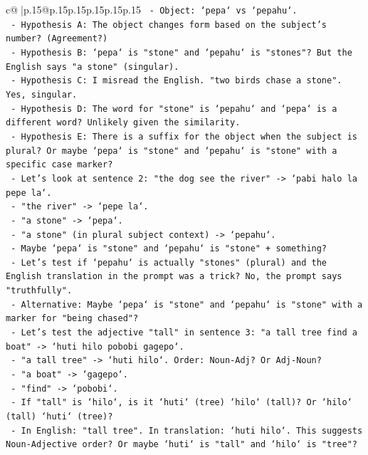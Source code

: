 \documentclass{article}
\begin{document}
{\begin{supertabular}{c@{$\;$}|p{.15\linewidth}@{}p{.15\linewidth}p{.15\linewidth}p{.15\linewidth}p{.15\linewidth}p{.15\linewidth}}
{{{\texttt{     {-} Object: `pepa` vs `pepahu`.} \\
\texttt{     {-} Hypothesis A: The object changes form based on the subject's number? (Agreement?)} \\
\texttt{     {-} Hypothesis B: `pepa` is "stone" and `pepahu` is "stones"? But the English says "a stone" (singular).} \\
\texttt{     {-} Hypothesis C: I misread the English. "two birds chase a stone". Yes, singular.} \\
\texttt{     {-} Hypothesis D: The word for "stone" is `pepahu` and `pepa` is a different word? Unlikely given the similarity.} \\
\texttt{     {-} Hypothesis E: There is a suffix for the object when the subject is plural? Or maybe `pepa` is "stone" and `pepahu` is "stone" with a specific case marker?} \\
\texttt{     {-} Let's look at sentence 2: "the dog see the river" {-}> `pabi halo la pepe la`.} \\
\texttt{       {-} "the river" {-}> `pepe la`.} \\
\texttt{       {-} "a stone" {-}> `pepa`.} \\
\texttt{       {-} "a stone" (in plural subject context) {-}> `pepahu`.} \\
\texttt{     {-} Maybe `pepa` is "stone" and `pepahu` is "stone" + something?} \\
\texttt{     {-} Let's test if `pepahu` is actually "stones" (plural) and the English translation in the prompt was a trick? No, the prompt says "truthfully".} \\
\texttt{     {-} Alternative: Maybe `pepa` is "stone" and `pepahu` is "stone" with a marker for "being chased"?} \\
\texttt{     {-} Let's test the adjective "tall" in sentence 3: "a tall tree find a boat" {-}> `huti hilo pobobi gagepo`.} \\
\texttt{       {-} "a tall tree" {-}> `huti hilo`. Order: Noun{-}Adj? Or Adj{-}Noun?} \\
\texttt{       {-} "a boat" {-}> `gagepo`.} \\
\texttt{       {-} "find" {-}> `pobobi`.} \\
\texttt{       {-} If "tall" is `hilo`, is it `huti` (tree) `hilo` (tall)? Or `hilo` (tall) `huti` (tree)?} \\
\texttt{       {-} In English: "tall tree". In translation: `huti hilo`. This suggests Noun{-}Adjective order? Or maybe `huti` is "tall" and `hilo` is "tree"?} \\
}}}
\end{supertabular}}
\end{document}
